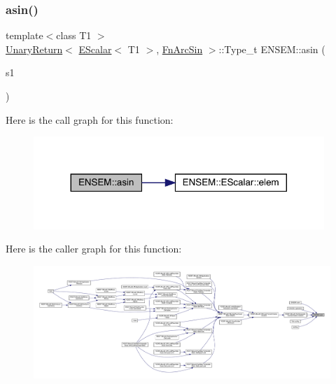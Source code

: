 \subsubsection{\texorpdfstring{asin()}{asin()}}
{\footnotesize\ttfamily template$<$class T1 $>$ \\
\mbox{\hyperlink{structENSEM_1_1UnaryReturn}{Unary\+Return}}$<$ \mbox{\hyperlink{classENSEM_1_1EScalar}{E\+Scalar}}$<$ T1 $>$, \mbox{\hyperlink{structENSEM_1_1FnArcSin}{Fn\+Arc\+Sin}} $>$\+::Type\+\_\+t E\+N\+S\+E\+M\+::asin (\begin{DoxyParamCaption}\item[{const \mbox{\hyperlink{classENSEM_1_1EScalar}{E\+Scalar}}$<$ T1 $>$ \&}]{s1 }\end{DoxyParamCaption})\hspace{0.3cm}{\ttfamily [inline]}}

Here is the call graph for this function\+:
\nopagebreak
\begin{figure}[H]
\begin{center}
\leavevmode
\includegraphics[width=311pt]{d4/dca/group__escalar_gab463bdb3f1fadf6b5a87076e5d3dc9b9_cgraph}
\end{center}
\end{figure}
Here is the caller graph for this function\+:
\nopagebreak
\begin{figure}[H]
\begin{center}
\leavevmode
\includegraphics[width=350pt]{d4/dca/group__escalar_gab463bdb3f1fadf6b5a87076e5d3dc9b9_icgraph}
\end{center}
\end{figure}
\mbox{\label{group__escalar_ga3169598490417ab5713660967ec6b658}} 
